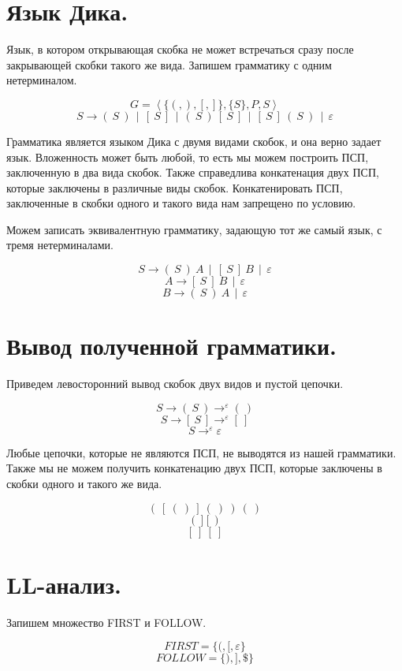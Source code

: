 \documentclass[a4paper,12pt]{article}
\date{ВШЭ ПМИ, 6 вариант, 2022 г.}
\author{Алексей Косенко}
\theoremstyle{plain} %
\theoremstyle{definition} %
\theoremstyle{remark} %
\begin{document}
\maketitle

\section{Язык Дика.}

Язык, в котором открывающая скобка не может встречаться сразу после закрывающей скобки такого же вида. Запишем грамматику с одним нетерминалом.

$$G = \left< \{(, ), [, ]\}, \{S\}, P, S \right>$$
$$S \rightarrow ( \ S \ ) \ \ | \ \ [ \ S \ ] \ \  | \ \ ( \ S \ ) \ [ \ S \ ] \ \ | \ \ [ \ S \ ] \ ( \ S \ ) \ \ | \ \ \varepsilon$$

Грамматика является языком Дика с двумя видами скобок, и она верно задает язык. Вложенность может быть любой, то есть мы можем построить ПСП, заключенную в два вида скобок. Также справедлива конкатенация двух ПСП, которые заключены в различные виды скобок. Конкатенировать ПСП, заключенные в скобки одного и такого вида нам запрещено по условию.

Можем записать эквивалентную грамматику, задающую тот же самый язык, с тремя нетерминалами.

$$S \rightarrow ( \ S \ ) \ A \ \ | \ \ [ \ S \ ] \ B \ \ | \ \ \varepsilon $$
$$A \rightarrow [ \ S \ ] \ B \ \  | \ \ \varepsilon $$
$$B \rightarrow ( \ S \ ) \ A \ \ | \ \ \varepsilon $$

\section{Вывод полученной грамматики.}
Приведем левосторонний вывод скобок двух видов и пустой цепочки.

$$S \rightarrow ( \ S \ ) \rightarrow^{\varepsilon} ( \ )$$
$$S \rightarrow [ \ S \ ] \rightarrow^{\varepsilon} [ \ ]$$
$$S \rightarrow^{\varepsilon} \varepsilon$$

Любые цепочки, которые не являются ПСП, не выводятся из нашей грамматики. Также мы не можем получить конкатенацию двух ПСП, которые заключены в скобки одного и такого же вида.

$$( \ [ \ ( \ ) \ ] \ ( \ ) \ ) \ ( \ )$$
$$( \ ] \ [ \ )$$
$$[ \ ] \ [ \ ]$$

\section{LL-анализ.}
Запишем множество FIRST и FOLLOW.

$$FIRST = \{ (, [, \varepsilon \}$$
$$FOLLOW = \{ ), ], \$ \}$$
\end{document}
